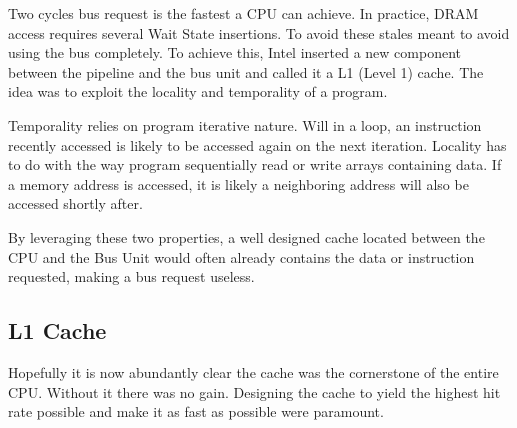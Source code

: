 \par
Two cycles bus request is the fastest a CPU can achieve. In practice, DRAM access requires several Wait State insertions.
To avoid these stales meant to avoid using the bus completely. To achieve this, Intel inserted a new component between the pipeline and the bus unit and called it a L1 (Level 1) cache. The idea was to exploit the locality and temporality of a program.\\
\par
Temporality relies on program iterative nature. Will in a loop, an instruction recently accessed is likely to be accessed again on the next iteration. Locality has to do with the way program sequentially read or write arrays containing data. If a memory address is accessed, it is likely a neighboring address will also be accessed shortly after.\\
\par
By leveraging these two properties, a well designed cache located between the CPU and the Bus Unit would often already contains the data or instruction requested, making a bus request useless.\\
\par
{}




\subsection{L1 Cache}
Hopefully it is now abundantly clear the cache was the cornerstone of the entire CPU. Without it there was no gain. Designing the cache to yield the highest hit rate possible and make it as fast as possible were paramount. 

